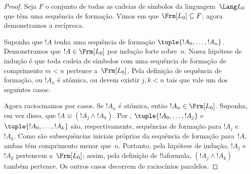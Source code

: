 \documentclass[../../../include/open-logic-section]{subfiles}
\begin{document}
\begin{proof}
Seja $F$ o conjunto de todas as cadeias de símbolos da
linguagem~$\Lang L_0$ que têm uma sequência de formação.
Vimos em  que
$\Frm[L_0] \subseteq F$; agora demonstramos a recíproca.

Suponha que $!A$ tenha uma sequência de formação
$\tuple{!A_0,\dotsc,!A_n}$. Demonstramos que $!A \in \Frm[L_0]$ por
indução forte sobre~$n$. Nossa hipótese de indução é que toda cadeia de
símbolos com uma sequência de formação de comprimento $m < n$ pertence
a~$\Frm[L_0]$. Pela definição de sequência de formação, ou $!A_n$ é
atômica, ou devem existir $j,k < n$ tais que vale um dos seguintes casos:
\begin{enumerate}
\end{enumerate}
Agora raciocinamos por casos. Se $!A_n$ é atômica, então
$!A_n \in \Frm[L_0]$. Suponha, em vez disso, que $!A \equiv
(!A_j \land !A_k)$. Por ,
$\tuple{!A_0,\dotsc,!A_j}$ e $\tuple{!A_0,\dotsc,!A_k}$ são,
respectivamente, sequências de formação para $!A_j$ e~$!A_k$. Como são
subsequências iniciais próprias da sequência de formação para~$!A$, ambas
têm comprimento menor que~$n$. Portanto, pela hipótese de indução, $!A_j$
e~$!A_k$ pertencem a~$\Frm[L_0]$; assim, pela definição de !!a{formula},
$(!A_j \land !A_k)$ também pertence. Os outros casos decorrem de raciocínios
paralelos.
\end{proof}
\end{document}
